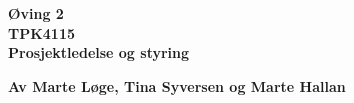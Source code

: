 \begin{titlepage}
\begin{center}

{\Huge \bf Øving 2} \\[1.0cm]
{\Huge \bf TPK4115} \\[1.0cm]
{\Large \bf Prosjektledelse og styring} \\[1.0cm]
\vspace{1cm}

{\bf Av Marte Løge, Tina Syversen og Marte Hallan}


\end{center}
\end{titlepage}